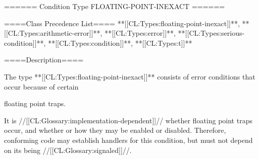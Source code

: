 ====== Condition Type FLOATING-POINT-INEXACT ======

====Class Precedence List==== **[[CL:Types:floating-point-inexact]]**, **[[CL:Types:arithmetic-error]]**, **[[CL:Types:error]]**, **[[CL:Types:serious-condition]]**, **[[CL:Types:condition]]**, **[[CL:Types:t]]**

====Description====

The type **[[CL:Types:floating-point-inexact]]** consists of error conditions that occur because of certain

floating point traps.

It is //[[CL:Glossary:implementation-dependent]]// whether floating point traps occur, and whether or how they may be enabled or disabled. Therefore, conforming code may establish handlers for this condition, but must not depend on its being //[[CL:Glossary:signaled]]//.

